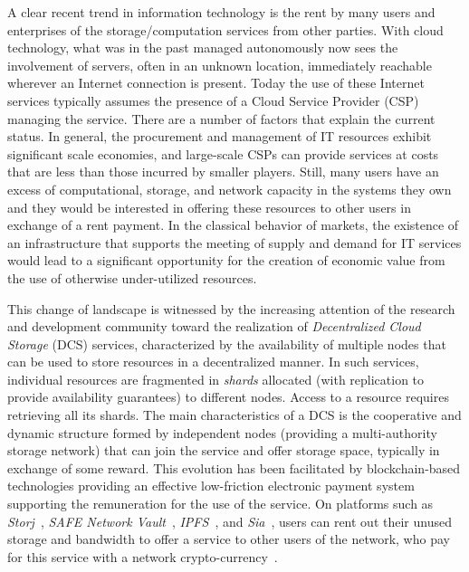 A clear recent trend in information technology is the rent by many
users and enterprises of the storage/computation services from other
parties. With cloud technology, what was in the past managed
autonomously now sees the involvement of servers, often in an unknown
location, immediately reachable wherever an Internet connection is
present.  Today the use of these Internet services typically assumes
the presence of a Cloud Service Provider (CSP) managing the service.
There are a number of factors that explain the current status. In
general, the procurement and management of IT resources exhibit
significant scale economies, and large-scale CSPs can provide services
at costs that are less than those incurred by smaller players. Still,
many users have an excess of computational, storage, and network
capacity in the systems they own and they would be interested in
offering these resources to other users in exchange of a rent
payment. In the classical behavior of markets, the existence of an
infrastructure that supports the meeting of supply and demand for IT
services would lead to a significant opportunity for the creation of
economic value from the use of otherwise under-utilized resources.


This change of landscape is witnessed by the increasing attention of
the research and development community toward the realization of {\em
	Decentralized Cloud Storage\/} (DCS) services, characterized by the
availability of multiple nodes that can be used to store resources in
a decentralized manner. In such services, individual resources are
fragmented in {\em shards\/} allocated (with replication to provide
availability guarantees) to different nodes.  Access to a resource
requires retrieving all its shards.  The main characteristics of a DCS
is the cooperative and dynamic structure formed by independent nodes
(providing a multi-authority storage network) that can join the
service and offer storage space, typically in exchange of some reward.
This evolution has been facilitated by blockchain-based technologies
providing an effective low-friction electronic payment system
supporting the remuneration for the use of the service.  On platforms
such as {\em Storj}~\cite{wilkinson2014storj}, {\em SAFE Network
	Vault}~\cite{irvine2010maidsafe,paul2014security}, {\em
	IPFS}~\cite{benet2014ipfs}, and {\em Sia}~\cite{vorick2014sia},
users can rent out their unused storage and bandwidth to offer a
service to other users of the network, who pay for this service with a
network crypto-currency~\cite{sc-distributed-content-delivery}.



